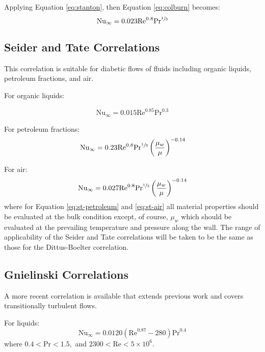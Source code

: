 Applying Equation \ref{eq:stanton}, then Equation \ref{eq:colburn} becomes:
\begin{equation}
\text{Nu}_{\infty} = 0.023 \text{Re}^{0.8}\text{Pr}^{\sfrac{1}{3}}
\end{equation}

\subsection{Seider and Tate Correlations} 
This correlation\cite{sieder1936heat} is suitable for diabetic flows of fluids including organic liquids, petroleum fractions, and air.  

For organic liquids:

\begin{equation}
\text{Nu}_{\infty} = 0.015 \text{Re}^{0.85} \text{Pr}^{0.3}
\label{eq:st-organic}
\end{equation}

For petroleum fractions:
\begin{equation}
\text{Nu}_{\infty} = 0.23 \text{Re}^{0.8}\text{Pr}^{\sfrac{1}{3}}\left(\frac{\mu_w}{\mu} \right)^{-0.14}
\label{eq:st-petroleum}
\end{equation}

For air:
\begin{equation}
\text{Nu}_{\infty} = 0.027 \text{Re}^{0.8}\text{Pr}^{\sfrac{1}{3}}\left(\frac{\mu_w}{\mu} \right)^{-0.14}
\label{eq:st-air}
\end{equation}
where for Equation \ref{eq:st-petroleum} and \ref{eq:st-air} all material properties should be evaluated at the bulk condition except, of course, $\mu_w$ which should be evaluated at the prevailing temperature and pressure along the wall.  The range of applicability of the Seider and Tate correlations will be taken to be the same as those for the Dittus-Boelter correlation.

\subsection{Gnielinski Correlations} 
A more recent correlation\cite{gnielinski1976new} is available that extends previous work and covers transitionally turbulent flows. 

For liquids:
\begin{equation}
\text{Nu}_{\infty} = 0.0120\left(\text{Re}^{0.87}-280 \right)\text{Pr}^{0.4}
\label{eq:gniel-liquid}
\end{equation}
where $0.4 < \text{Pr} < 1.5,$ and $2300 < \text{Re} < 5 \times 10^6$.

